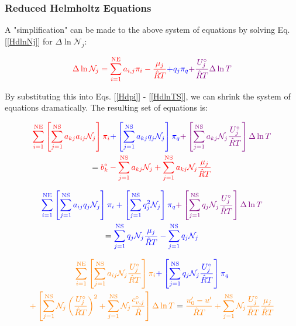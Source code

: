 \documentclass[10pt]{article}
\begin{document}
\begin{flushleft}
\subsubsection{Reduced Helmholtz Equations}

A "simplification" can be made to the above system of equations by solving Eq. [\ref{HdlnNj}] for $\Delta \ln \mathcal{N}_j$:

\begin{equation}
    \textcolor{red}{\Delta \ln \mathcal{N}_j =  \sum_{i=1}^\text{NE}a_{i,j}\pi_i -\frac{\mu_j}{\hat{R}T} } \textcolor{blue}{+ q_j \pi_q}\textcolor{violet}{ + \frac{U_j^\circ}{\hat{R}T} \Delta \ln T }
    \label{redH0}
\end{equation}

By substituting this into Eqs. [\ref{Hdpi}] - [\ref{HdlnTS}], we can shrink the system of equations dramatically. The resulting set of equations is:

\begin{multline}
    \textcolor{red}{\sum_{i=1}^\text{NE} \left[ \sum_{j=1}^\text{NS} a_{kj} a_{ij} \mathcal{N}_j \right] \pi_i} \textcolor{blue}{+ \left[\sum_{j=1}^\text{NS} a_{kj} q_j\mathcal{N}_j \right] \pi_q} \textcolor{violet}{+ \left[ \sum_{j=1}^\text{NS} a_{kj} \mathcal{N}_j\frac{ U_j^\circ}{\hat{R}T} \right] \Delta \ln T} \\ = \textcolor{red}{b_k^\circ - \sum_{j=1}^\text{NS} a_{kj} \mathcal{N}_j +  \sum_{j=1}^\text{NS} a_{kj} \mathcal{N}_j\frac{ \mu_j}{\hat{R}T}}
    \label{redH1}
\end{multline}

\begin{multline}
    \textcolor{blue}{\sum_{i=1}^\text{NE} \left[ \sum_{j=1}^\text{NS} a_{ij} q_j \mathcal{N}_j \right] \pi_i + \left[ \sum_{j=1}^\text{NS}  q_j^2 \mathcal{N}_j \right] \pi_q} \textcolor{violet}{+ \left[ \sum_{j=1}^\text{NS} q_j \mathcal{N}_j\frac{ U_j^\circ}{\hat{R}T} \right] \Delta \ln T} \\= \textcolor{blue}{\sum_{j=1}^\text{NS} q_j \mathcal{N}_j \frac{\mu_j}{\hat{R}T} - \sum_{j=1}^\text{NS} q_j \mathcal{N}_j}
    \label{redH2}
\end{multline}

\begin{multline}
    \textcolor{orange}{\sum_{i=1}^\text{NE} \left[ \sum_{j=1}^\text{NS} a_{ij} \mathcal{N}_j\frac{ U_j^\circ}{\hat{R}T} \right] \pi_i} \textcolor{blue}{+ \left[ \sum_{j=1}^\text{NS} q_j \mathcal{N}_j \frac{ U_j^\circ}{\hat{R}T} \right] \pi_q} \\ \textcolor{orange}{+ \left[ \sum_{j=1}^\text{NS} \mathcal{N}_j \left( \frac{ U_j^{\circ}}{\hat{R} T} \right)^2 + \sum_{j=1}^\text{NS} \mathcal{N}_j \frac{ c_{v,j}^\circ}{\hat{R}} \right] \Delta \ln T}
     = \textcolor{orange}{\frac{u_0' - u'}{\hat{R}T} + \sum_{j=1}^\text{NS} \mathcal{N}_j \frac{ U_j^\circ}{\hat{R} T} \frac{\mu_j}{\hat{R}T}}
    \label{redH3}
\end{multline}


\end{flushleft}
\end{document}
